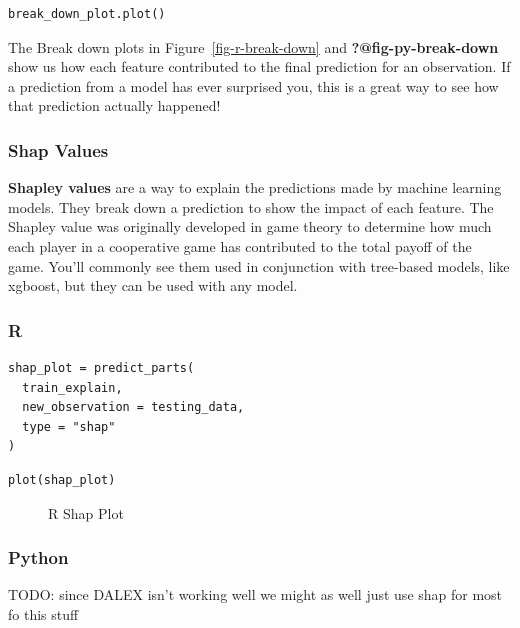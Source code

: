 \documentclass[
  letterpaper,
]{krantz}
\begin{document}
\begin{verbatim}
break_down_plot.plot()
\end{verbatim}

The Break down plots in Figure~\ref{fig-r-break-down} and
\textbf{?@fig-py-break-down} show us how each feature contributed to the
final prediction for an observation. If a prediction from a model has
ever surprised you, this is a great way to see how that prediction
actually happened!

\subsubsection{Shap Values}\label{sec-model-explore-shap-values}

\textbf{Shapley values} are a way to explain the predictions made by
machine learning models. They break down a prediction to show the impact
of each feature. The Shapley value was originally developed in game
theory to determine how much each player in a cooperative game has
contributed to the total payoff of the game. You'll commonly see them
used in conjunction with tree-based models, like xgboost, but they can
be used with any model.

\subsubsection{R}

\begin{verbatim}
shap_plot = predict_parts(
  train_explain, 
  new_observation = testing_data, 
  type = "shap"
)
\end{verbatim}

\begin{verbatim}
plot(shap_plot)
\end{verbatim}

\begin{figure}[H]


\caption{\label{fig-r-shap}R Shap Plot}

\end{figure}%

\subsubsection{Python}

TODO: since DALEX isn't working well we might as well just use shap for
most fo this stuff
\end{document}
